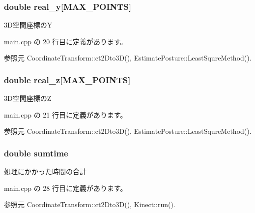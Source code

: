 \subsubsection[{real\-\_\-y}]{\setlength{\rightskip}{0pt plus 5cm}double real\-\_\-y[{\bf M\-A\-X\-\_\-\-P\-O\-I\-N\-T\-S}]}\label{_estimate_posture_8h_aac94948837fe999fddb50973fa27e450}


3\-D空間座標の\-Y 



 main.\-cpp の 20 行目に定義があります。



参照元 Coordinate\-Transform\-::ct2\-Dto3\-D(), Estimate\-Posture\-::\-Least\-Squre\-Method().

\subsubsection[{real\-\_\-z}]{\setlength{\rightskip}{0pt plus 5cm}double real\-\_\-z[{\bf M\-A\-X\-\_\-\-P\-O\-I\-N\-T\-S}]}\label{_estimate_posture_8h_ad04bdcf4918f232afcf6cccf8937f53b}


3\-D空間座標の\-Z 



 main.\-cpp の 21 行目に定義があります。



参照元 Coordinate\-Transform\-::ct2\-Dto3\-D(), Estimate\-Posture\-::\-Least\-Squre\-Method().

\subsubsection[{sumtime}]{\setlength{\rightskip}{0pt plus 5cm}double sumtime}\label{_estimate_posture_8h_a93d6409f5890605dbee315b522395064}


処理にかかった時間の合計 



 main.\-cpp の 28 行目に定義があります。



参照元 Coordinate\-Transform\-::ct2\-Dto3\-D(), Kinect\-::run().

